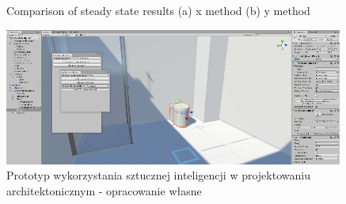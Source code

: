 \documentclass[runningheads]{llncs}
\begin{document}
\begin{figure}
     \centering
     \hspace{0.5cm}
     \caption{Comparison of steady state results (a) x method (b) y method}
     \label{steady_state}
\end{figure}

\begin{figure}[H]
\centering
\includegraphics[width=\textwidth, height=4.5cm]{editor4.png}
\caption{Prototyp wykorzystania sztucznej inteligencji w projektowaniu architektonicznym - opracowanie własne} \label{fig6}
\end{figure}
\end{document}
